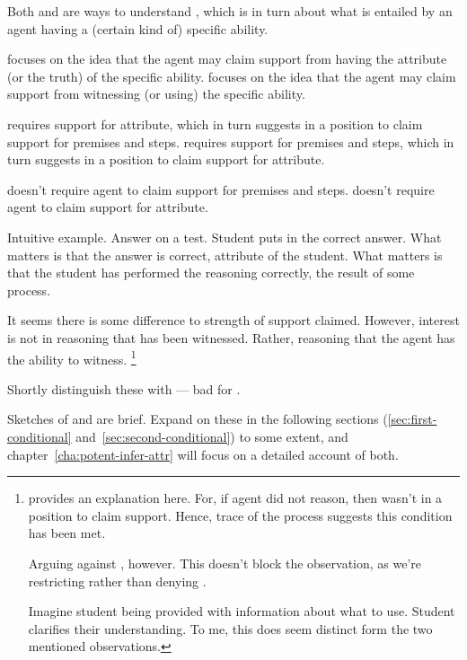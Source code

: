 \begin{note}
  Both \AR{} and \WR{} are ways to understand \aben{}, which is in turn about what is entailed by an agent having a (certain kind of) specific ability.

  \AR{} focuses on the idea that the agent may claim support from having the attribute (or the truth) of the specific ability.
  \WR{} focuses on the idea that the agent may claim support from witnessing (or using) the specific ability.

  \AR{} requires support for attribute, which in turn suggests in a position to claim support for premises and steps.
  \WR{} requires support for premises and steps, which in turn suggests in a position to claim support for attribute.

  \AR{} doesn't require agent to claim support for premises and steps.
  \WR{} doesn't require agent to claim support for attribute.

  Intuitive example.
  Answer on a test.
  Student puts in the correct answer.
  What matters is that the answer is correct, attribute of the student.
  What matters is that the student has performed the reasoning correctly, the result of some process.

  It seems there is some difference to strength of support claimed.
  However, interest is not in reasoning that has been witnessed.
  Rather, reasoning that the agent has the ability to witness.\nolinebreak
  \footnote{
    \uRa{} provides an explanation here.
    For, if agent did not reason, then wasn't in a position to claim support.
    Hence, trace of the process suggests this condition has been met.

    Arguing against \uRa{}, however.
    This doesn't block the observation, as we're restricting \uRa{} rather than denying \uRa{}.

    Imagine student being provided with information about what to use.
    Student clarifies their understanding.
    To me, this does seem distinct form the two mentioned observations.
  }

  Shortly distinguish these with \uRa{} --- bad for \WR{}.
\end{note}

\begin{note}
  Sketches of \AR{} and \WR{} are brief.
  Expand on these in the following sections (\ref{sec:first-conditional} and~\ref{sec:second-conditional}) to some extent, and chapter~\ref{cha:potent-infer-attr} will focus on a detailed account of both.
\end{note}

